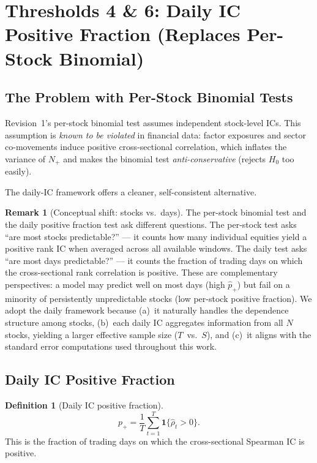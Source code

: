 \documentclass[11pt,a4paper]{article}
\theoremstyle{definition}
\newtheorem{definition}{Definition}[section]
\newtheorem{remark}{Remark}[section]
\newcommand{\Ho}{H_{0}}
\begin{document}
\section{Thresholds 4 \& 6: Daily IC Positive Fraction (Replaces Per-Stock Binomial)}
\label{sec:thresh4_6}

\subsection{The Problem with Per-Stock Binomial Tests}

Revision~1's per-stock binomial test assumes independent stock-level
ICs. This assumption is \emph{known to be violated} in financial data:
factor exposures and sector co-movements induce positive cross-sectional
correlation, which inflates the variance of $N_{+}$ and makes the
binomial test \emph{anti-conservative} (rejects $\Ho$ too easily).

The daily-IC framework offers a cleaner, self-consistent alternative.

\begin{remark}[Conceptual shift: stocks vs.\ days]
\label{rem:conceptual_shift}
The per-stock binomial test and the daily positive fraction test ask
different questions.  The per-stock test asks ``are most stocks
predictable?'' --- it counts how many individual equities yield a
positive rank IC when averaged across all available windows.  The daily
test asks ``are most days predictable?'' --- it counts the fraction of
trading days on which the cross-sectional rank correlation is positive.
These are complementary perspectives: a model may predict well on most
days (high $\hat{p}_{+}$) but fail on a minority of persistently
unpredictable stocks (low per-stock positive fraction).  We adopt the
daily framework because (a)~it naturally handles the dependence
structure among stocks, (b)~each daily IC aggregates information from
all $N$ stocks, yielding a larger effective sample size ($T$~vs.~$S$),
and (c)~it aligns with the standard error computations used throughout
this work.
\end{remark}

\subsection{Daily IC Positive Fraction}

\begin{definition}[Daily IC positive fraction]
\label{def:p_plus}
\begin{equation}
    p_{+} = \frac{1}{T}\sum_{t=1}^{T} \mathbf{1}\{\hat{\rho}_{t} > 0\}.
\end{equation}
This is the fraction of trading days on which the cross-sectional
Spearman IC is positive.
\end{definition}
\end{document}
